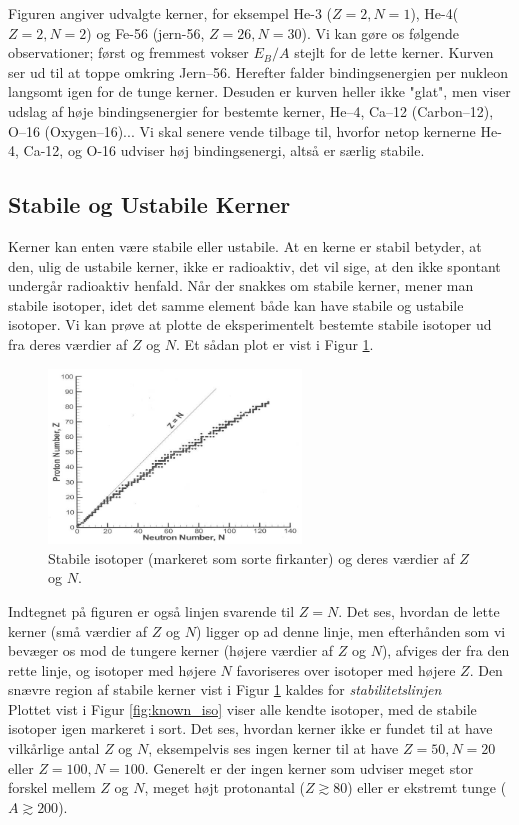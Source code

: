 Figuren angiver udvalgte kerner, for eksempel He-3 ($Z=2,N=1$), He-4($Z=2,N=2$) og Fe-56 (jern-56, $Z=26,N=30$). Vi kan gøre os følgende observationer; først og fremmest vokser $E_B/A$ stejlt for de lette kerner. Kurven ser ud til at toppe omkring Jern--56. Herefter falder bindingsenergien per nukleon langsomt igen for de tunge kerner. Desuden er kurven heller ikke "glat",  men viser udslag af høje bindingsenergier for bestemte kerner, He--4, Ca--12 (Carbon--12), O--16 (Oxygen--16)... Vi skal senere vende tilbage til, hvorfor netop kernerne  He-4, Ca-12, og O-16 udviser høj bindingsenergi, altså er særlig stabile.

\subsection{Stabile og Ustabile Kerner}
Kerner kan enten være stabile eller ustabile. At en kerne er stabil betyder, at den, ulig de ustabile kerner, ikke er radioaktiv, det vil sige, at den ikke spontant undergår radioaktiv henfald. Når der snakkes om stabile kerner, mener man stabile isotoper, idet det samme element både kan have stabile og ustabile isotoper. Vi kan prøve at plotte de eksperimentelt bestemte stabile isotoper ud fra deres værdier af $Z$ og $N$. Et sådan plot er vist i Figur \ref{fig:stable_iso}.

\begin{figure}[h!]
  \centering
  \includegraphics[width=0.6\textwidth]{KernePartikel/stable_nucleides.jpg}
  \caption{Stabile isotoper (markeret som sorte firkanter) og deres værdier af $Z$ og $N$.}
  \label{fig:stable_iso}
\end{figure}

Indtegnet på figuren er også linjen svarende til $Z=N$. Det ses, hvordan de lette kerner (små værdier af $Z$ og $N$) ligger op ad denne linje, men efterhånden som vi bevæger os mod de tungere kerner (højere værdier af $Z$ og $N$), afviges der fra den rette linje, og isotoper med højere $N$ favoriseres over isotoper med højere $Z$. Den snævre region af stabile kerner vist i Figur \ref{fig:stable_iso} kaldes for \emph{stabilitetslinjen} \\
Plottet vist i Figur \ref{fig:known_iso} viser alle kendte isotoper, med de stabile isotoper igen markeret i sort. Det ses, hvordan kerner ikke er fundet til at have vilkårlige antal $Z$ og $N$, eksempelvis ses ingen kerner til at have $Z=50, N=20$ eller $Z=100, N=100$. Generelt er der ingen kerner som udviser meget stor forskel mellem $Z$ og $N$, meget højt protonantal ($Z \gtrsim 80$) eller er ekstremt tunge ($A \gtrsim 200$). 

